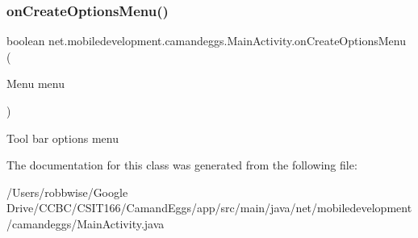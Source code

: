 \subsubsection{\texorpdfstring{on\+Create\+Options\+Menu()}{onCreateOptionsMenu()}}
{\footnotesize\ttfamily boolean net.\+mobiledevelopment.\+camandeggs.\+Main\+Activity.\+on\+Create\+Options\+Menu (\begin{DoxyParamCaption}\item[{Menu}]{menu }\end{DoxyParamCaption})}

Tool bar options menu 

The documentation for this class was generated from the following file\+:\begin{DoxyCompactItemize}
\item 
/\+Users/robbwise/\+Google Drive/\+C\+C\+B\+C/\+C\+S\+I\+T166/\+Camand\+Eggs/app/src/main/java/net/mobiledevelopment/camandeggs/Main\+Activity.\+java\end{DoxyCompactItemize}
